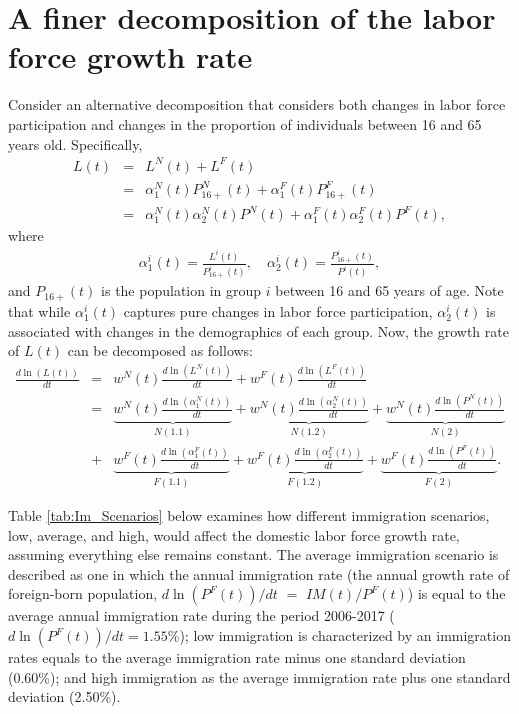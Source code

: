 \documentclass[
    abstract=true,
    11pt,
    letterpaper,
    oneside,
    headinclude,
    footinclude,
    BCOR=5mm,
]{scrartcl}
\begin{document}
\section{A finer decomposition of the labor force growth rate} \label{sec:a_finer_decomposition}
Consider an alternative decomposition that considers both changes in labor force participation and changes in the proportion of individuals between 16 and 65 years old. Specifically,
\begin{eqnarray}
L(t) &=& L^N(t) + L^{F}(t) \nonumber \\
&=& \alpha^N_1(t) P_{16+}^N(t) + \alpha^{F}_1(t) P_{16+}^{F}(t) \nonumber \\
&=& \alpha^N_1(t) \alpha^N_2(t) P^N(t) + \alpha^{F}_1(t) \alpha^{F}_2(t)P^{F}(t), \nonumber
\end{eqnarray}
where
\begin{eqnarray}
\alpha^i_1(t) = \frac{L^i(t)}{P_{16+}^i(t)}, \quad \alpha^i_2(t) = \frac{P_{16+}^i(t)}{P^i(t)}, \nonumber
\end{eqnarray}
and $P_{16+}(t)$ is the population in group $i$ between 16 and 65 years of age.
Note that while $\alpha^i_1(t)$ captures pure changes in labor force participation, $\alpha^i_2(t)$ is associated with changes in the demographics of each group. Now, the growth rate of $L(t)$ can be decomposed as follows:
\begin{eqnarray}
  \frac{d \ln(L(t))}{dt}&=& w^N(t) \frac{d \ln(L^N(t))}{dt} + w^{F}(t) \frac{d \ln(L^{F}(t))}{dt} \nonumber \\
  &=& \underbrace{w^N(t) \frac{d \ln(\alpha_1^N(t))}{dt}}_{N(1.1)} + \underbrace{w^N(t) \frac{d \ln(\alpha_2^N(t))}{dt}}_{N(1.2)} + \underbrace{w^N(t) \frac{d \ln(P^N(t))}{dt}}_{N(2)} \nonumber \\
  &+& \underbrace{w^{F}(t) \frac{d \ln(\alpha_1^{F}(t))}{dt}}_{F(1.1)} + \underbrace{w^{F}(t) \frac{d \ln(\alpha_2^{F}(t))}{dt}}_{F(1.2)} + \underbrace{w^{F}(t) \frac{d \ln(P^{F}(t))}{dt}}_{F(2)}. \nonumber
\end{eqnarray}

Table \ref{tab:Im_Scenarios} below examines how different immigration scenarios, low, average, and high, would affect the domestic labor force growth rate, assuming everything else remains constant. The average immigration scenario is described as one in which the annual immigration rate (the annual growth rate of foreign-born population, $d\ln(P^F(t))/dt$ $=$ $IM(t)/P^F(t)$) is equal to the average annual immigration rate during the period 2006-2017 ($d\ln(P^F(t))/dt = 1.55\%$); low immigration is characterized by an immigration rates equals to the average immigration rate minus one standard deviation (0.60\%); and high immigration as the average immigration rate plus one standard deviation (2.50\%).
\end{document}
